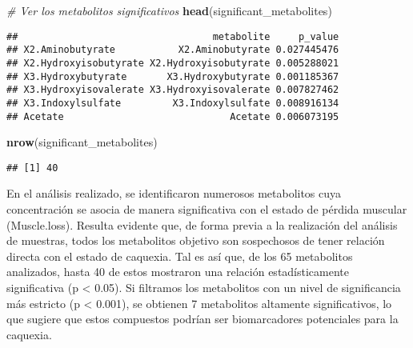 \documentclass[
]{article}
\newenvironment{Shaded}{\begin{snugshade}}{\end{snugshade}}
\newcommand{\CommentTok}[1]{\textcolor[rgb]{0.56,0.35,0.01}{\textit{#1}}}
\newcommand{\FloatTok}[1]{\textcolor[rgb]{0.00,0.00,0.81}{#1}}
\newcommand{\FunctionTok}[1]{\textcolor[rgb]{0.13,0.29,0.53}{\textbf{#1}}}
\newcommand{\NormalTok}[1]{#1}
\newcommand{\OtherTok}[1]{\textcolor[rgb]{0.56,0.35,0.01}{#1}}
\newcommand{\SpecialCharTok}[1]{\textcolor[rgb]{0.81,0.36,0.00}{\textbf{#1}}}
\begin{document}
\begin{Shaded}
\begin{Highlighting}[]
\CommentTok{\# Ver los metabolitos significativos}
\FunctionTok{head}\NormalTok{(significant\_metabolites)}
\end{Highlighting}
\end{Shaded}

\begin{verbatim}
##                                  metabolite     p_value
## X2.Aminobutyrate           X2.Aminobutyrate 0.027445476
## X2.Hydroxyisobutyrate X2.Hydroxyisobutyrate 0.005288021
## X3.Hydroxybutyrate       X3.Hydroxybutyrate 0.001185367
## X3.Hydroxyisovalerate X3.Hydroxyisovalerate 0.007827462
## X3.Indoxylsulfate         X3.Indoxylsulfate 0.008916134
## Acetate                             Acetate 0.006073195
\end{verbatim}

\begin{Shaded}
\begin{Highlighting}[]
\FunctionTok{nrow}\NormalTok{(significant\_metabolites)}
\end{Highlighting}
\end{Shaded}

\begin{verbatim}
## [1] 40
\end{verbatim}

En el análisis realizado, se identificaron numerosos metabolitos cuya
concentración se asocia de manera significativa con el estado de pérdida
muscular (Muscle.loss). Resulta evidente que, de forma previa a la
realización del análisis de muestras, todos los metabolitos objetivo son
sospechosos de tener relación directa con el estado de caquexia. Tal es
así que, de los 65 metabolitos analizados, hasta 40 de estos mostraron
una relación estadísticamente significativa (p \textless{} 0.05). Si
filtramos los metabolitos con un nivel de significancia más estricto (p
\textless{} 0.001), se obtienen 7 metabolitos altamente significativos,
lo que sugiere que estos compuestos podrían ser biomarcadores
potenciales para la caquexia.

\begin{Shaded}
\end{Shaded}
\end{document}
